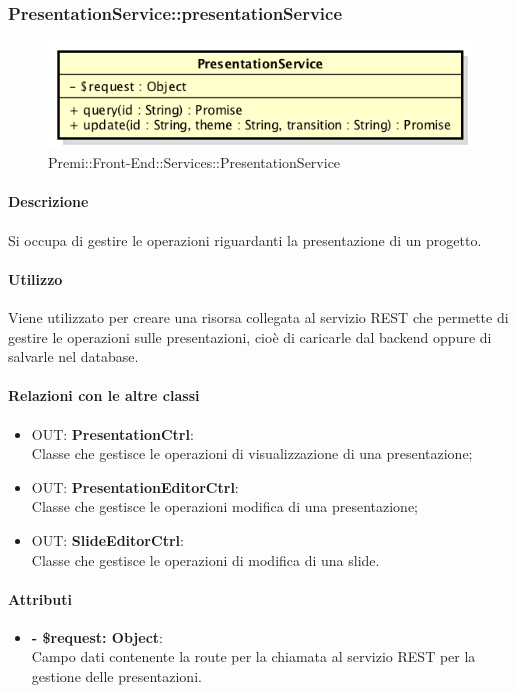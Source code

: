 		\subsubsection{PresentationService::presentationService}
		\begin{figure}[h]
			\centering
				\includegraphics[width=0.5\linewidth]{img/premi_front_end_services_presentationservice}
			\caption[Premi::Front-End::Services::PresentationService]{Premi::Front-End::Services::PresentationService}
		\end{figure}
		
		\paragraph{Descrizione}
		Si occupa di gestire le operazioni riguardanti la presentazione di un progetto.
		
		\paragraph{Utilizzo}
		Viene utilizzato per creare una risorsa collegata al servizio \gls{REST} che permette di gestire le operazioni sulle presentazioni, cioè di caricarle dal backend oppure di salvarle nel \gls{database}.
		
		\paragraph{Relazioni con le altre classi}
		\begin{itemize}
			\item OUT: \textbf{PresentationCtrl}:\\
			Classe che gestisce le operazioni di visualizzazione di una presentazione;
			\item OUT: \textbf{PresentationEditorCtrl}:\\
			Classe che gestisce le operazioni modifica di una presentazione;
			\item OUT: \textbf{SlideEditorCtrl}:\\
			Classe che gestisce le operazioni di modifica di una \gls{slide}.
		\end{itemize}
		
		\paragraph{Attributi}
		\begin{itemize}
			\item \textbf{- \$request: Object}:\\
			Campo dati contenente la route per la chiamata al servizio \gls{REST} per la gestione delle presentazioni.
		\end{itemize}	
		
